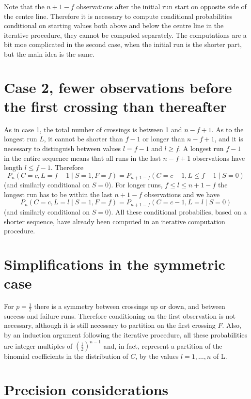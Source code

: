 Note that the $n+1-f$ observations after the initial run start on opposite side of the centre line. Therefore it is necessary to compute conditional probabilities conditional on starting values both above and below the centre line in the iterative procedure, they cannot be computed separately. The computations are a bit moe complicated in the second case, when the initial run is the shorter part, but the main idea is the same.

\section{Case 2, fewer observations before the first crossing than thereafter}

As in case 1, the total number of crossings is between 1 and $n-f+1$. As to the longest run $L$, it cannot be shorter than $f-1$ or longer than $n-f+1$, and it is necessary to distinguish between values $l=f-1$ and $l \geq f$. A longest run $f-1$ in the entire sequence means that all runs in the last $n-f+1$ observations have length $l \leq f-1$. Therefore $$P_n (C=c,L=f-1 \mid S=1,F=f) = P_{n+1-f} (C=c-1,L \leq f-1 \mid S=0)$$(and similarly conditional on $S=0$). For longer runs, $f \leq l \leq n+1-f$ the longest run has to be within the last $n+1-f$ observations and we have $$P_n (C=c,L=l \mid S=1,F=f) = P_{n+1-f} (C=c-1,L=l \mid S=0)$$(and similarly conditional on $S = 0$). All these conditional probabilies, based on a shorter sequence, have already been computed in an iterative computation procedure.

\section{Simplifications in the symmetric case}

For $p=\frac{1}{2}$ there is a symmetry between crossings up or down, and between success and failure runs. Therefore conditioning on the first observation is not necessary, although it is still necessary to partition on the first crossing $F$. Also, by an induction argument following the iterative procedure, all these probabilities are integer multiples of ${\left( \frac{1}{2} \right)}^{n-1}$ and, in fact, represent a partition of the binomial coefficients in the distribution of $C$, by the values $l=1, \ldots ,n$ of L.  

\section{Precision considerations}

